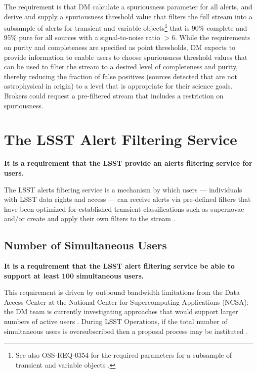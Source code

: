 \documentclass[DM,authoryear,toc]{lsstdoc}
\begin{document}
The requirement is that \gls{DM} calculate a spuriousness parameter for all alerts, and derive and supply a spuriousness threshold value that filters the full stream into a subsample of alerts for \gls{transient} and variable objects\footnote{See also \gls{OSS}-REQ-0354 for the required parameters for a subsample of \gls{transient} and variable objects .} that is 90\% complete and 95\% pure for all sources with a signal-to-noise ratio $>$6. While the requirements on purity and completeness are specified as point thresholds, \gls{DM} expects to provide information to enable users to choose spuriousness threshold values that can be used to filter the stream to a desired level of completeness and purity, thereby reducing the fraction of false positives (sources detected that are not astrophysical in origin) to a level that is appropriate for their science goals. Brokers could request a pre-filtered stream that includes a restriction on spuriousness.


\section{The \gls{LSST} Alert Filtering Service} \label{sec:LAFS}

{\bf It is a requirement that the \gls{LSST} provide an alerts filtering service for users.} 

The \gls{LSST} alerts filtering service is a mechanism by which users --- individuals with \gls{LSST} data rights and access --- can receive alerts via pre-defined filters that have been optimized for established \gls{transient} classifications such as supernovae and/or create and apply their own filters to the stream . 


\subsection{Number of Simultaneous Users}\label{ssec:LAFS_users}

{\bf It is a requirement that the \gls{LSST} alert filtering service be able to support at least 100 simultaneous users.}

This requirement is driven by outbound bandwidth limitations from the Data Access \gls{Center} at the National \gls{Center} for Supercomputing Applications (\gls{NCSA}); the \gls{DM} team is currently investigating approaches that would support larger numbers of active users . During \gls{LSST} \gls{Operations}, if the total number of simultaneous users is oversubscribed then a proposal process may be instituted .
\end{document}
